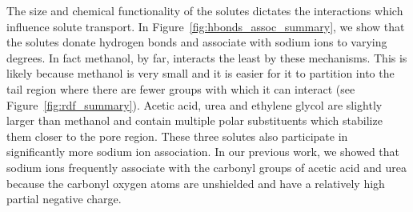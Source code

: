 \documentclass[journal=jpcbfk,manuscript=article]{achemso}
\begin{document}
  The size and chemical functionality of the solutes dictates the interactions which
  influence solute transport. In Figure~\ref{fig:hbonds_assoc_summary}, we show that the
  solutes donate hydrogen bonds and associate with sodium ions to varying degrees.
  In fact methanol, by far, interacts the least by these mechanisms. This is likely 
  because methanol is very small and it is easier for it to partition into the tail
  region where there are fewer groups with which it can interact (see Figure~\ref{fig:rdf_summary}).
  Acetic acid, urea and ethylene glycol are slightly larger than methanol and contain 
  multiple polar substituents which stabilize them closer to the pore region.
  These three solutes also participate in significantly more sodium ion association. 
  In our previous work, we showed that sodium ions frequently associate with the 
  carbonyl groups of acetic acid and urea because the carbonyl oxygen atoms are
  unshielded and have a relatively high partial negative charge.~\cite{coscia_chemically_2019}
  
\end{document}
